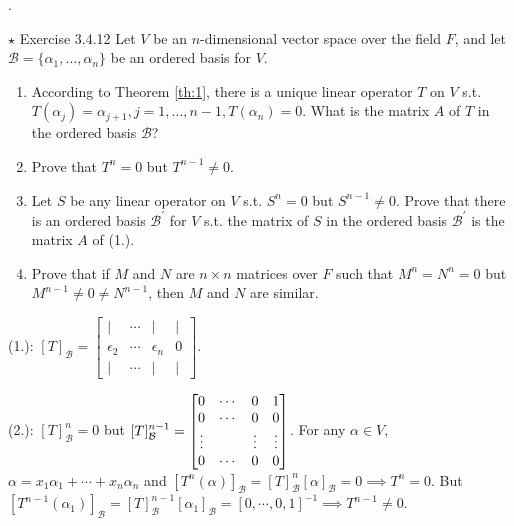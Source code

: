 \documentclass[8pt]{beamer}
\newcommand{\mc}[1]{\mathcal{#1}}
\begin{document}
\begin{frame}{.}
    \begin{block}{$\star$ Exercise 3.4.12}
        Let $V$ be an $n$-dimensional vector space over the field $F$, and let $\mc{B} = \{\alpha_1, \dots, \alpha_n\}$ be an ordered basis for $V$.
        \begin{enumerate}
            \item According to Theorem \ref{th:1}, there is a unique linear operator $T$ on $V$ s.t. $T(\alpha_j) = \alpha_{j+1}, j=1, \dots, n-1,T(\alpha_n) = 0$.
            What is the matrix $A$ of $T$ in the ordered basis $\mc{B}$?
            \item Prove that $T^n = 0$ but $T^{n-1} \neq 0$.
            \item Let $S$ be any linear operator on $V$ s.t. $S^n = 0$ but $S^{n-1} \neq 0$.
            Prove that there is an ordered basis $\mc{B}^\prime$ for $V$ s.t. the matrix of $S$ in the ordered basis $\mc{B}^\prime$ is the matrix $A$ of (1.).
            \item Prove that if $M$ and $N$ are $n \times n$ matrices over $F$ such that $M^n = N^n = 0$ but $M^{n-1} \neq 0 \neq N^{n-1}$, then $M$ and $N$ are similar.
        \end{enumerate}
    \end{block}
    (1.): $[T]_{\mc{B}} = \begin{bmatrix}
     | & \cdots &| & | \\ \epsilon_2 & \cdots &\epsilon_n & 0 \\ | & \cdots & | &|
    \end{bmatrix}$.

    (2.): $[T]^n_{\mc{B}} = 0$ but $[T]^{n-1}_{\mc{B}} = \begin{bmatrix}
        0 & \cdots & 0 & 1 \\ 0 & \cdots & 0 & 0 \\ \vdots & \empty & \vdots & \vdots \\ 0 & \cdots & 0 & 0
    \end{bmatrix}$.
    For any $\alpha \in V$, $\alpha = x_1 \alpha_1 + \cdots + x_n \alpha_n$ and $[T^n (\alpha)]_{\mc{B}} = [T]^n_{\mc{B}} [\alpha]_{\mc{B}} = 0 \implies T^n = 0$.
    But $[T^{n-1}(\alpha_1)]_{\mc{B}} = [T]^{n-1}_{\mc{B}} [\alpha_1]_{\mc{B}} = [0, \cdots, 0, 1]^{-1} \implies T^{n-1} \neq 0$.
\end{frame}
\end{document}
